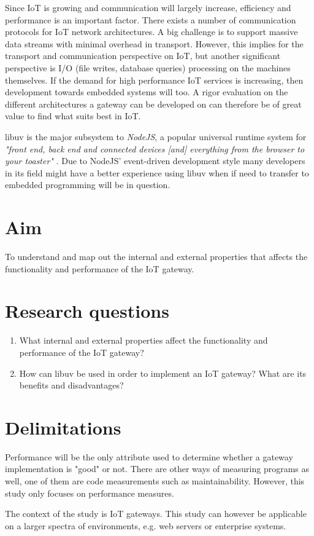 Since IoT is growing and communication will largely increase, efficiency and
performance is an important factor. There exists a number of communication
protocols for IoT network architectures. A big challenge is to support massive
data streams with minimal overhead in transport. However, this implies for the
transport and communication perspective on IoT, but another significant
perspective is I/O (file writes, database queries) processing on the machines
themselves. If the demand for high performance IoT services is increasing, then
development towards embedded systems will too. A rigor evaluation on the
different architectures a gateway can be developed on can therefore be of great
value to find what suits best in IoT.

libuv is the major subsystem to \textit{NodeJS}, a popular universal runtime
system for \textit{"front end, back end and connected devices [and] everything
from the browser to your toaster"} \cite{node-js-survey-report-2016}. Due to
NodeJS' event-driven development style many developers in its field might have
a better experience using libuv when if need to transfer to embedded
programming will be in question.

\section{Aim}
\label{sec:aim}

To understand and map out the internal and external properties that affects the
functionality and performance of the IoT gateway.

\section{Research questions}
\label{sec:research-questions}

\begin{enumerate}

    \item What internal and external properties affect the functionality and
        performance of the IoT gateway?

    \item How can libuv be used in order to implement an IoT gateway? What are
        its benefits and disadvantages?

\end{enumerate}

\section{Delimitations}
\label{sec:delimitations}

Performance will be the only attribute used to determine whether a gateway
implementation is "good" or not. There are other ways of measuring programs as
well, one of them are code measurements such as maintainability. However, this
study only focuses on performance measures.

The context of the study is IoT gateways. This study can however be applicable
on a larger spectra of environments, e.g. web servers or enterprise systems.
